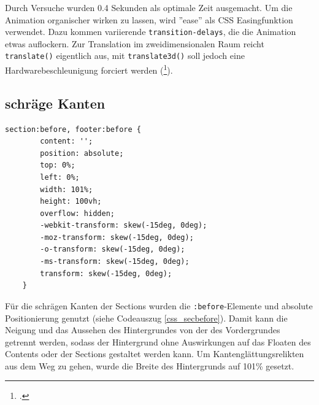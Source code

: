 Durch Versuche wurden 0.4 Sekunden als optimale Zeit ausgemacht. Um die Animation organischer wirken zu lassen, wird ''ease'' als CSS Easingfunktion verwendet. Dazu kommen variierende \lstinline{transition-delays}, die die Animation etwas auflockern.
Zur Translation im zweidimensionalen Raum reicht \lstinline{translate()} eigentlich aus, mit \lstinline{translate3d()} soll jedoch eine Hardwarebeschleunigung forciert werden (\footcite[vgl.][]{css3D}).

\subsection{schräge Kanten}
\begin{lstlisting}[caption=Der Hintergrund der Section als Container., label=css_secbefore]
section:before, footer:before {
        content: '';
        position: absolute;
        top: 0%;
        left: 0%;
        width: 101%;
        height: 100vh;
        overflow: hidden;
        -webkit-transform: skew(-15deg, 0deg);
        -moz-transform: skew(-15deg, 0deg);
        -o-transform: skew(-15deg, 0deg);
        -ms-transform: skew(-15deg, 0deg);
        transform: skew(-15deg, 0deg);
    }
\end{lstlisting}

Für die schrägen Kanten der Sections wurden die \lstinline{:before}-Elemente und absolute Positionierung genutzt (siehe Codeauszug \ref{css_secbefore}). Damit kann die Neigung und das Aussehen des Hintergrundes von der des Vordergrundes getrennt werden, sodass der Hintergrund ohne Auswirkungen auf das Floaten des Contents oder der Sections gestaltet werden kann. Um Kantenglättungsrelikten aus dem Weg zu gehen, wurde die Breite des Hintergrunds auf 101\% gesetzt.
